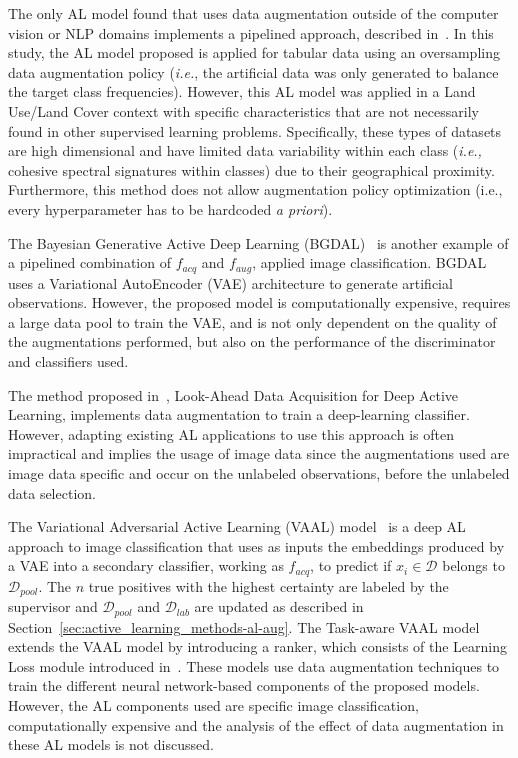 The only AL model found that uses data augmentation outside of the
computer vision or NLP domains implements a pipelined approach, described
in~\cite{Fonseca2021al}. In this study, the AL model proposed is applied for
tabular data using an oversampling data augmentation policy
(\textit{i.e.}, the artificial data was only generated to balance the target
class frequencies). However, this AL model was applied in a Land
Use/Land Cover context with specific characteristics that are not necessarily
found in other supervised learning problems. Specifically, these types of
datasets are high dimensional and have limited data variability within each
class (\textit{i.e.,} cohesive spectral signatures within classes) due to
their geographical proximity. Furthermore, this method does not allow
augmentation policy optimization (i.e., every hyperparameter has to be
hardcoded \textit{a priori}).

The Bayesian Generative Active Deep Learning
(BGDAL)~\cite{tran2019bayesian} is another example of a pipelined
combination of $f_{acq}$ and $f_{aug}$, applied image classification. BGDAL
uses a Variational AutoEncoder (VAE) architecture to generate artificial
observations. However, the proposed model is computationally expensive,
requires a large data pool to train the VAE, and is not only dependent on the
quality of the augmentations performed, but also on the performance of the
discriminator and classifiers used.

The method proposed in~\cite{Kim2021}, Look-Ahead Data Acquisition for Deep
Active Learning, implements data augmentation to train a deep-learning
classifier. However, adapting existing AL applications to use this
approach is often impractical and implies the usage of image data since the
augmentations used are image data specific and occur on the unlabeled
observations, before the unlabeled data selection.

The Variational Adversarial Active Learning (VAAL)
model~\cite{sinha2019variational} is a deep AL approach to image
classification that uses as inputs the embeddings produced by a VAE into a
secondary classifier, working as $f_{acq}$, to predict if $x_i \in
\mathcal{D}$ belongs to $\mathcal{D}_{pool}$. The $n$ true positives with the
highest certainty are labeled by the supervisor and $\mathcal{D}_{pool}$ and
$\mathcal{D}_{lab}$ are updated as described in
Section~\ref{sec:active_learning_methods-al-aug}. The Task-aware VAAL
model~\cite{kim2021task} extends the VAAL model by introducing a ranker,
which consists of the Learning Loss module introduced in~\cite{Yoo2019}.
These models use data augmentation techniques to train the different
neural network-based components of the proposed models. However, the AL
components used are specific image classification, computationally expensive
and the analysis of the effect of data augmentation in these AL models is not
discussed.

